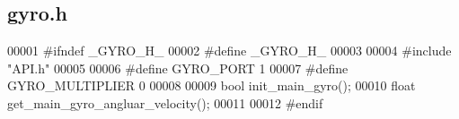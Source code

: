\subsection{gyro.\+h}
\label{gyro_8h_source}

\begin{DoxyCode}
00001 \textcolor{preprocessor}{#ifndef \_GYRO\_H\_}
00002 \textcolor{preprocessor}{#define \_GYRO\_H\_}
00003 
00004 \textcolor{preprocessor}{#include "API.h"}
00005 
00006 \textcolor{preprocessor}{#define GYRO\_PORT 1}
00007 \textcolor{preprocessor}{#define GYRO\_MULTIPLIER 0}
00008 
00009 \textcolor{keywordtype}{bool} init_main_gyro();
00010 \textcolor{keywordtype}{float} get_main_gyro_angluar_velocity();
00011 
00012 \textcolor{preprocessor}{#endif}
\end{DoxyCode}
